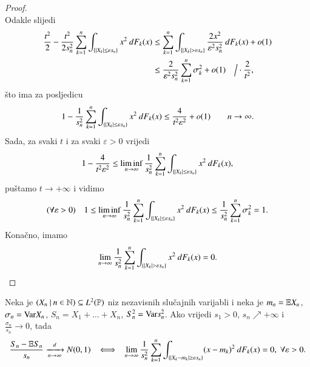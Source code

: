 \begin{proof}
\begin{equation*}
    \end{equation*}
    Odakle slijedi
    \begin{equation*}
        \begin{aligned}
            \frac{t^2}{2} - \frac{t^2}{2 s_n^2} \sum\limits_{k = 1}^{n} \int_{\{ |X_k| \leq \varepsilon s_n \}} x^2 \: d F_k (x) &\leq \sum\limits_{k = 1}^{n} \int_{\{ |X_k| > \varepsilon s_n \}} \frac{2 x^2}{\varepsilon^2 s_n^2} \: d F_k (x) + o(1)\\
            &\leq \frac{2}{\varepsilon^2 s_n^2} \sum\limits_{k = 1}^{n} \sigma_k^2 + o (1) \quad \Big/ \cdot \frac{2}{t^2},
        \end{aligned}
    \end{equation*}
    \v sto ima za posljedicu
    \begin{equation*}
        1 - \frac{1}{s_n^2} \sum\limits_{k = 1}^{n} \int_{\{ |X_k| \leq \varepsilon s_n \}} x^2 \: d F_k (x) \leq \frac{4}{t^2 \varepsilon^2} + o(1) \quad \quad n \to \infty.
    \end{equation*}
    Sada, za svaki $t$ i za svaki $\varepsilon > 0$ vrijedi
    \begin{equation*}
        1 - \frac{4}{t^2 \varepsilon^2} \leq \liminf_{n \to \infty} \frac{1}{s_n^2} \sum\limits_{k = 1}^{n} \int_{\{ |X_k| \leq \varepsilon s_n \}} x^2 \: d F_k (x),
    \end{equation*}
    pu\v stamo $t \to +\infty$ i vidimo
    \begin{equation*}
        (\forall \varepsilon > 0) \quad 1 \leq \liminf\limits_{n \to \infty} \frac{1}{s_n^2} \sum\limits_{k = 1}^{n} \int_{\{ |X_k| \leq \varepsilon s_n \}} x^2 \: d F_k (x) \leq \frac{1}{s_n^2} \sum\limits_{k = 1}^{n} \sigma_k^2 = 1.
    \end{equation*}
    Kona\v cno, imamo
    \begin{equation*}
        \lim\limits_{n \to \infty} \frac{1}{s_n^2} \sum\limits_{k = 1}^{n} \int_{\{ |X_k| > \varepsilon s_n \}} x^2 \: d F_k (x) = 0.
    \end{equation*}
\end{proof}

\begin{kor}  \label{kor:19.13}
    Neka je $({X_n} \: | \: {n \in \mathbb{N}}) \subseteq L^2 (\mathbb{P})$ niz nezavisnih slu\v cajnih varijabli i neka je $m_n = \mathbb{E} X_n$, $\sigma_n = \mathrm{Var} X_n$, $S_n = X_1 + \ldots + X_n$, $S_n^2 = \mathrm{Var} s_n^2$.
    Ako vrijedi $s_1 > 0$, $s_n \nearrow +\infty$ i $\frac{\sigma_n}{s_n} \to 0$, tada
    \begin{equation*}
        \frac{S_n - \mathbb{E} S_n}{s_n} \xrightarrow[n \to \infty]{d} N(0, 1) \; \; \iff \; \; \lim\limits_{n \to \infty} \frac{1}{s_n^2} \sum\limits_{k = 1}^{n} \int_{\{ |X_k - m_k| \geq \varepsilon s_n \}} (x - m_k)^2 \: d F_k (x) = 0, \; \forall \varepsilon > 0.
    \end{equation*}
\end{kor}

